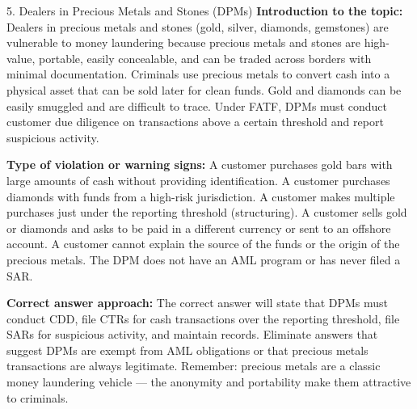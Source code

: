 \documentclass[11pt,a4paper]{beamer}
\begin{document}
\begin{frame}{5. Dealers in Precious Metals and Stones (DPMs)}
\tiny
\noindent\textbf{Introduction to the topic:} Dealers in precious metals and stones (gold, silver, diamonds, gemstones) are vulnerable to money laundering because precious metals and stones are high-value, portable, easily concealable, and can be traded across borders with minimal documentation. Criminals use precious metals to convert cash into a physical asset that can be sold later for clean funds. Gold and diamonds can be easily smuggled and are difficult to trace. Under FATF, DPMs must conduct customer due diligence on transactions above a certain threshold and report suspicious activity.

\vspace{0.1cm}
\noindent\textbf{Type of violation or warning signs:} A customer purchases gold bars with large amounts of cash without providing identification. A customer purchases diamonds with funds from a high-risk jurisdiction. A customer makes multiple purchases just under the reporting threshold (structuring). A customer sells gold or diamonds and asks to be paid in a different currency or sent to an offshore account. A customer cannot explain the source of the funds or the origin of the precious metals. The DPM does not have an AML program or has never filed a SAR.

\vspace{0.1cm}
\noindent\textbf{Correct answer approach:} The correct answer will state that DPMs must conduct CDD, file CTRs for cash transactions over the reporting threshold, file SARs for suspicious activity, and maintain records. Eliminate answers that suggest DPMs are exempt from AML obligations or that precious metals transactions are always legitimate. Remember: precious metals are a classic money laundering vehicle — the anonymity and portability make them attractive to criminals.
\end{frame}
\end{document}
